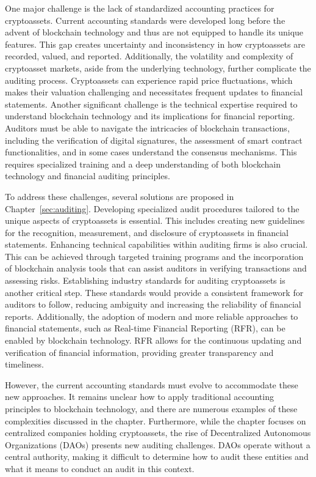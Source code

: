 One major challenge is the lack of standardized accounting practices for cryptoassets. Current accounting standards were developed long before the advent of blockchain technology and thus are not equipped to handle its unique features. This gap creates uncertainty and inconsistency in how cryptoassets are recorded, valued, and reported. Additionally, the volatility and complexity of cryptoasset markets, aside from the underlying technology, further complicate the auditing process. Cryptoassets can experience rapid price fluctuations, which makes their valuation challenging and necessitates frequent updates to financial statements. Another significant challenge is the technical expertise required to understand blockchain technology and its implications for financial reporting. Auditors must be able to navigate the intricacies of blockchain transactions, including the verification of digital signatures, the assessment of smart contract functionalities, and in some cases understand the consensus mechanisms. This requires specialized training and a deep understanding of both blockchain technology and financial auditing principles.

To address these challenges, several solutions are proposed in Chapter~\ref{sec:auditing}. Developing specialized audit procedures tailored to the unique aspects of cryptoassets is essential. This includes creating new guidelines for the recognition, measurement, and disclosure of cryptoassets in financial statements. Enhancing technical capabilities within auditing firms is also crucial. This can be achieved through targeted training programs and the incorporation of blockchain analysis tools that can assist auditors in verifying transactions and assessing risks. Establishing industry standards for auditing cryptoassets is another critical step. These standards would provide a consistent framework for auditors to follow, reducing ambiguity and increasing the reliability of financial reports. Additionally, the adoption of modern and more reliable approaches to financial statements, such as Real-time Financial Reporting (RFR), can be enabled by blockchain technology. RFR allows for the continuous updating and verification of financial information, providing greater transparency and timeliness.

However, the current accounting standards must evolve to accommodate these new approaches. It remains unclear how to apply traditional accounting principles to blockchain technology, and there are numerous examples of these complexities discussed in the chapter. Furthermore, while the chapter focuses on centralized companies holding cryptoassets, the rise of Decentralized Autonomous Organizations (DAOs) presents new auditing challenges. DAOs operate without a central authority, making it difficult to determine how to audit these entities and what it means to conduct an audit in this context.

